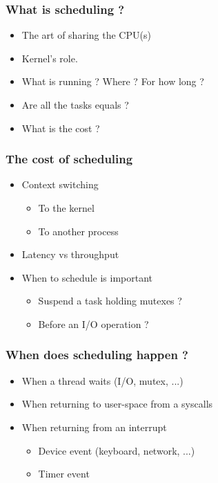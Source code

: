 \begin{frame}
  \frametitle{What is scheduling ?}

  \begin{itemize}
  \item The art of sharing the CPU(s)
  \item Kernel's role.
  \item What is running ? Where ? For how long ?
  \item Are all the tasks equals ?
  \item What is the cost ?
  \end{itemize}
\end{frame}


\begin{frame}
  \frametitle{The cost of scheduling}

  \begin{itemize}
  \item Context switching
    \begin{itemize}
    \item To the kernel
    \item To another process
    \end{itemize}
  \item Latency vs throughput
  \item When to schedule is important
    \begin{itemize}
    \item Suspend a task holding mutexes ?
    \item Before an I/O operation ?
    \end{itemize}
  \end{itemize}
\end{frame}


\begin{frame}
  \frametitle{When does scheduling happen ?}

  \begin{itemize}
  \item When a thread waits (I/O, mutex, ...)
  \item When returning to user-space from a syscalls
  \item When returning from an interrupt
    \begin{itemize}
    \item Device event (keyboard, network, ...)
    \item Timer event
    \end{itemize}
  \end{itemize}
\end{frame}


